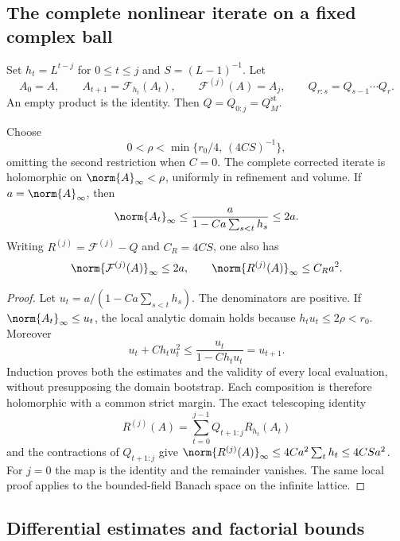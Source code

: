 \subsection{The complete nonlinear iterate on a fixed complex ball}
\label{na-uniform-ball}

Set $h_t=L^{t-j}$ for $0\le t\le j$ and $S=(L-1)^{-1}$. Let
\[
 A_0=A,\qquad A_{t+1}=\mathcal F_{h_t}(A_t),\qquad
 \mathcal F^{(j)}(A)=A_j,
 \qquad Q_{r:s}=Q_{s-1}\cdots Q_r.
\]
An empty product is the identity. Then $Q=Q_{0:j}=Q_M^{\mathrm{st}}$.

\begin{theorem}
\label{na-ball-theorem}
Choose
\begin{equation}
 0<\rho<\min\{r_0/4,\,(4CS)^{-1}\},
 \label{na-radius}
\end{equation}
omitting the second restriction when $C=0$. The complete corrected
iterate is holomorphic on $\norm{A}_\infty<\rho$, uniformly in
refinement and volume. If $a=\norm{A}_\infty$, then
\begin{equation}
 \norm{A_t}_\infty\le
 \frac{a}{1-Ca\sum_{s<t}h_s}\le2a.
 \label{na-riccati}
\end{equation}
Writing $R^{(j)}=\mathcal F^{(j)}-Q$ and $C_R=4CS$, one also has
\begin{equation}
 \norm{\mathcal F^{(j)}(A)}_\infty\le2a,
 \qquad \norm{R^{(j)}(A)}_\infty\le C_Ra^2.
 \label{na-composite-remainder}
\end{equation}
\end{theorem}

\begin{proof}
Let $u_t=a/(1-Ca\sum_{s<t}h_s)$. The denominators are positive.
If $\norm{A_t}_\infty\le u_t$, the local analytic domain holds
because $h_tu_t\le2\rho<r_0$. Moreover
\[
 u_t+Ch_tu_t^2\le\frac{u_t}{1-Ch_tu_t}=u_{t+1}.
\]
Induction proves both the estimates and the validity of every local
evaluation, without presupposing the domain bootstrap. Each
composition is therefore holomorphic with a common strict margin.
The exact telescoping identity
\[
 R^{(j)}(A)=\sum_{t=0}^{j-1}Q_{t+1:j}R_{h_t}(A_t)
\]
and the contractions of $Q_{t+1:j}$ give
$\norm{R^{(j)}(A)}_\infty\le4Ca^2\sum_t h_t\le4CSa^2$.
For $j=0$ the map is the identity and the remainder vanishes.
The same local proof applies to the bounded-field Banach space on
the infinite lattice.
\end{proof}

\subsection{Differential estimates and factorial bounds}
\label{na-differentials}

